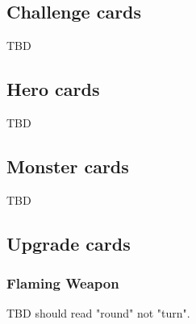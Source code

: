 \label{sec:ErrataAndFAQ}

\subsection{Challenge cards}
TBD

\subsection{Hero cards}
TBD

\subsection{Monster cards}
TBD

\subsection{Upgrade cards}

\subsubsection{Flaming Weapon}
TBD should read "round" not "turn".